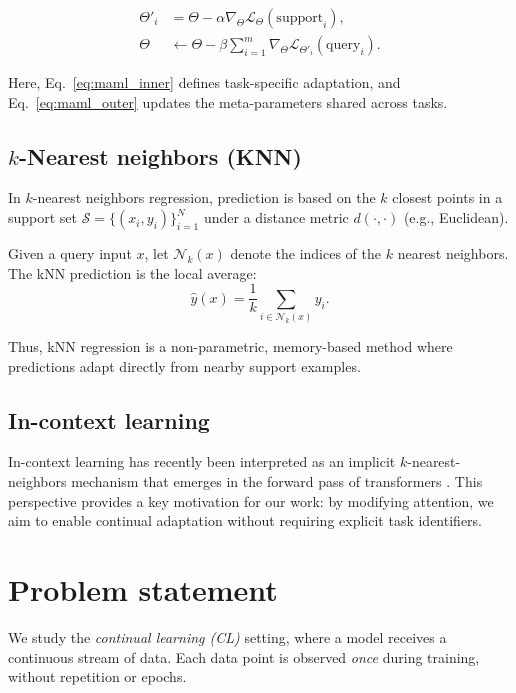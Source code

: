 \documentclass{article}
\begin{document}
\begin{align}
\Theta'_i &= \Theta - \alpha \nabla_\Theta \mathcal{L}_\Theta(\text{support}_i), \label{eq:maml_inner}\\[4pt]
\Theta &\leftarrow \Theta - \beta \sum_{i=1}^{m} \nabla_\Theta \mathcal{L}_{\Theta'_i}(\text{query}_i). \label{eq:maml_outer}
\end{align}

Here, Eq.~\ref{eq:maml_inner} defines task-specific adaptation, and Eq.~\ref{eq:maml_outer} updates the meta-parameters shared across tasks.



\subsection{$k$-Nearest neighbors (KNN)}
In $k$-nearest neighbors regression, prediction is based on the $k$ closest 
points in a support set $\mathcal{S} = \{(x_i,y_i)\}_{i=1}^N$ under a distance 
metric $d(\cdot,\cdot)$ (e.g., Euclidean).  

Given a query input $x$, let $\mathcal{N}_k(x)$ denote the indices of the $k$ 
nearest neighbors. The kNN prediction is the local average:
\begin{equation}
\hat{y}(x) = \frac{1}{k} \sum_{i \in \mathcal{N}_k(x)} y_i.
\label{eq:knn}
\end{equation}

Thus, kNN regression is a non-parametric, memory-based method where predictions 
adapt directly from nearby support examples.

\subsection{In-context learning}
In-context learning has recently been interpreted as an implicit $k$-nearest-neighbors mechanism that emerges in the forward pass of transformers \citep{olsson2022induction}. 
This perspective provides a key motivation for our work: by modifying attention, we aim to enable continual adaptation without requiring explicit task identifiers.


\section{Problem statement}
We study the \textit{continual learning (CL)} setting, where a model receives a continuous stream of data. Each data point is observed \textit{once} during training, without repetition or epochs.  
\end{document}
